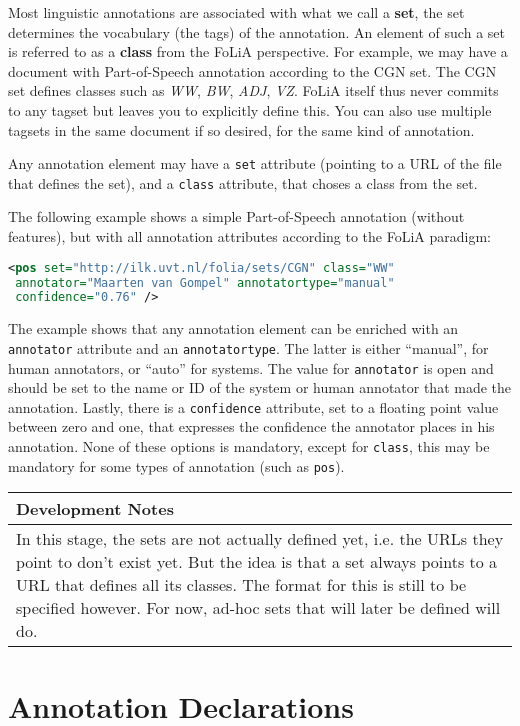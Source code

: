 \documentclass[a4paper,12pt]{report}
\newenvironment{devnotes}
{\newpage
\begin{center}
    \begin{tabular}[h!]{|p{0.8\textwidth}|}
    \hline
    {\bf Development Notes}\\\hline}
{   \\\hline
    \end{tabular}
\end{center}}
\begin{document}
Most linguistic annotations are associated with what we call a \textbf{set}, the set determines the vocabulary (the tags) of the annotation. An element of such a set is referred to as a \textbf{class} from the FoLiA perspective. For example, we may have a document with Part-of-Speech annotation according to the CGN set. The CGN set defines classes such as \emph{WW}, \emph{BW}, \emph{ADJ}, \emph{VZ}. FoLiA itself thus never commits to any tagset but leaves you to explicitly define this. You can also use multiple tagsets in the same document if so desired, for the same kind of annotation.

Any annotation element may have a \texttt{set} attribute (pointing to a URL of the file that defines the set), and a \texttt{class} attribute, that choses a class from the set.

The following example shows a simple Part-of-Speech annotation (without features), but with all annotation attributes according to the FoLiA paradigm:

\begin{lstlisting}[language=xml]
<pos set="http://ilk.uvt.nl/folia/sets/CGN" class="WW" 
 annotator="Maarten van Gompel" annotatortype="manual"
 confidence="0.76" />
\end{lstlisting}

The example shows that any annotation element can be enriched with an \texttt{annotator} attribute and an \texttt{annotatortype}. The latter is either ``manual'', for human annotators, or ``auto'' for systems.  The value for \texttt{annotator} is open and should be set to the name or ID of the system or human annotator that made the annotation. Lastly, there is a \texttt{confidence} attribute, set to a floating point value between zero and one, that expresses the confidence the annotator places in his annotation. None of these options is mandatory, except for \texttt{class}, this may be mandatory for some types of annotation (such as \texttt{pos}).

\begin{devnotes}
In this stage, the sets are not actually defined yet, i.e. the URLs they point to don't exist yet. But the idea is that a set always points to a URL that defines all its classes. The format for this is still to be specified however. For now, ad-hoc sets that will later be defined will do.
\end{devnotes}


\section{Annotation Declarations}
\end{document}
